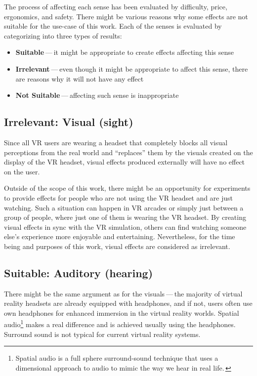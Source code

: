 The process of affecting each sense has been evaluated by difficulty,
price, ergonomics, and safety. There might be various reasons why some
effects are not suitable for the use-case of this work.
Each of the senses is evaluated by categorizing into three types of results:


\begin{itemize}
  \itemsep0em

  \item \textbf{Suitable} — it might be appropriate to create effects affecting this sense

  \item \textbf{Irrelevant} — even though it might be appropriate to affect this sense,
  there are reasons why it will not have any effect

  \item \textbf{Not Suitable} — affecting such sense is inappropriate

\end{itemize}


\hypertarget{x-irrelevant:-visual-(sight)}{\subsection{Irrelevant: Visual (sight)}}
Since all VR users are wearing a headset that completely blocks
all visual perceptions from the real world and ``replaces'' them by the visuals
created on the display of the VR headset, visual effects produced externally
will have no effect on the user.


Outside of the scope of this work, there might be an opportunity for experiments
to provide effects for people who are not using the VR headset and are
just watching. Such a situation can happen in VR arcades or simply
just between a group of people, where just one of them is wearing the VR headset.
By creating visual effects in sync with the VR
simulation, others can find watching someone else's experience
more enjoyable and entertaining. Nevertheless, for the time being and purposes
of this work, visual effects are considered as irrelevant.


\hypertarget{x-suitable:-auditory-(hearing)}{\subsection{Suitable: Auditory (hearing)}}
There might be the same argument as for the visuals — the majority of virtual reality headsets are already equipped with
headphones, and if not, users often use own headphones for
enhanced immersion in the virtual reality worlds.
Spatial audio\footnote{Spatial audio is a full sphere surround-sound technique that uses a 
dimensional approach to audio to mimic the way we hear in real life.\,\cite{spaudio}}
makes a real difference and is achieved usually using the headphones.
Surround sound is not typical for current virtual reality systems.

